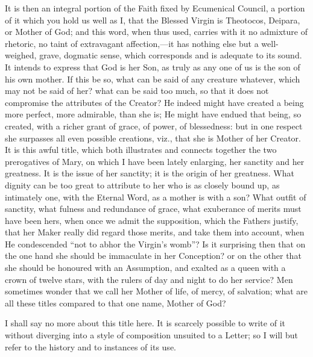 It is then an integral portion of the Faith fixed by Ecumenical
Council, a portion of it which you hold us well as I, that the Blessed
Virgin is Theotocos, Deipara, or Mother of God; and this word, when thus
used, carries with it no admixture of rhetoric, no taint of extravagant
affection,—it has nothing else but a well-weighed, grave, dogmatic
sense, which corresponds and is adequate to its sound. It intends to
express that God is her Son, as truly as any one of us is the son of his
own mother. If this be so, what can be said of any creature whatever,
which may not be said of her? what can be said too much, so that it does
not compromise the attributes of the Creator? He indeed might have
created a being more perfect, more admirable, than she is; He might have
endued that being, so created, with a richer grant of grace, of power,
of blessedness: but in one respect she surpasses all even possible
creations, viz., that she is Mother of her Creator. It is this awful
title, which both illustrates and connects together the two prerogatives
of Mary, on which I have been lately enlarging, her sanctity and her
greatness. It is the issue of her sanctity; it is the origin of her
greatness. What dignity can be too great to attribute to her who is
as closely bound up, as intimately one, with the Eternal Word, as a
mother is with a son? What outfit of sanctity, what fulness and
redundance of grace, what exuberance of merits must have been hers, when
once we admit the supposition, which the Fathers justify, that her Maker
really did regard those merits, and take them into account, when He
condescended ``not to abhor the Virgin's womb''? Is it
surprising then that on the one hand she should be immaculate in her
Conception? or on the other that she should be honoured with an
Assumption, and exalted as a queen with a crown of twelve stars, with
the rulers of day and night to do her service? Men sometimes wonder that
we call her Mother of life, of mercy, of salvation; what are all these
titles compared to that one name, Mother of God?

I shall say no more about this title here. It is scarcely possible to
write of it without diverging into a style of composition unsuited to a
Letter; so I will but refer to the history and to instances of its use.


